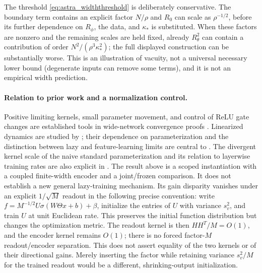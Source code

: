 \begin{remark}
The threshold \eqref{eq:astra_widththreshold} is deliberately
conservative. The boundary term contains an explicit factor $N/\rho$
and $R_0$ can scale as $\rho^{-1/2}$, before its further dependence
on $R_\phi$, the data, and $\kappa_*$ is substituted. When these
factors are nonzero and the remaining scales are held fixed, already
$R_\theta^2$ can contain a contribution of order
$N^2/(\rho^3\kappa_*^2)$; the full displayed construction can be
substantially worse. This is an illustration of vacuity, not a
universal necessary lower bound (degenerate inputs can remove some
terms), and it is not an empirical width prediction.
\end{remark}

\paragraph{Relation to prior work and a normalization control.}
Positive limiting kernels, small parameter movement, and control of
ReLU gate changes are established tools in wide-network convergence
proofs \citep{astra_du2019,astra_arora2019}. Linearized dynamics are
studied by \citet{astra_lee2019}; their dependence on parameterization
and the distinction between lazy and feature-learning limits are
central to \citet{astra_chizat2019,astra_yang2021}.
The divergent kernel scale of the naive standard parameterization and
its relation to layerwise training rates are also explicit in
\citet{astra_sohldickstein2020}.
The result above is a scoped instantiation with a coupled finite-width
encoder and a joint/frozen comparison. It does not establish a new
general lazy-training mechanism. Its gain disparity vanishes under
an explicit $1/\sqrt M$ readout in the following precise convention:
write $f=M^{-1/2}U\sigma(W\Theta x+b)+\beta$, initialize the entries
of $U$ with variance $s_v^2$, and train $U$ at unit Euclidean rate.
This preserves the initial function distribution but changes the
optimization metric. The readout kernel is then $HH^T/M=O(1)$,
and the encoder kernel remains $O(1)$; there is no forced factor-$M$
readout/encoder separation. This does not assert equality of the two
kernels or of their directional gains. Merely inserting the factor
while retaining variance $s_v^2/M$ for the trained readout would be
a different, shrinking-output initialization.

